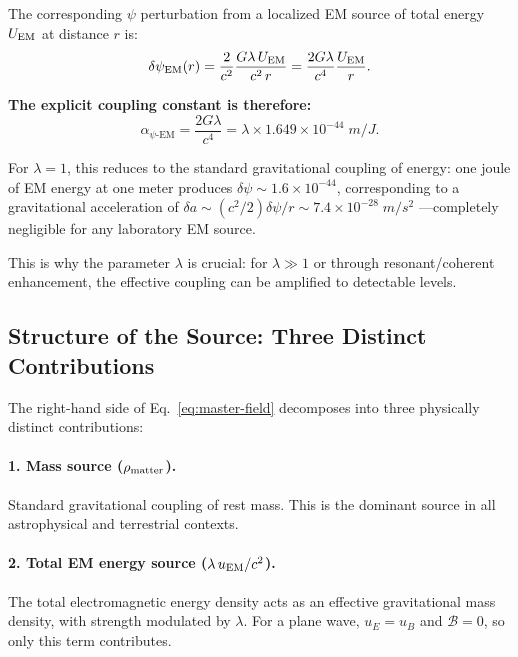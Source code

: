 \documentclass[aps,prd,twocolumn,superscriptaddress,floatfix,nofootinbib]{revtex4-2}
\newcommand{\lam}{\lambda}
\newcommand{\calB}{\mathcal{B}}
\begin{document}
The corresponding $\psi$ perturbation from a localized EM source of
total energy $U_{\rm EM}$ at distance $r$ is:
\begin{equation}
\delta\psi_{\rm EM}(r) = \frac{2}{c^2}\frac{G\lam\,U_{\rm EM}}{c^2\,r}
= \frac{2G\lam}{c^4}\frac{U_{\rm EM}}{r}.
\label{eq:psi-EM-coupling}
\end{equation}

\textbf{The explicit coupling constant is therefore:}
\begin{equation}
\boxed{
\alpha_{\psi\text{-EM}} = \frac{2G\lam}{c^4}
= \lam \times 1.649 \times 10^{-44}\;\si{m/J}.
}
\label{eq:coupling-explicit}
\end{equation}

For $\lam = 1$, this reduces to the standard gravitational coupling
of energy: one joule of EM energy at one meter produces
$\delta\psi \sim 1.6 \times 10^{-44}$, corresponding to a
gravitational acceleration of
$\delta a \sim (c^2/2)\delta\psi/r \sim 7.4 \times 10^{-28}\;\si{m/s^2}$
---completely negligible for any laboratory EM source.

This is why the parameter $\lam$ is crucial: for $\lam \gg 1$ or through
resonant/coherent enhancement, the effective coupling can be amplified
to detectable levels.

\subsection{Structure of the Source: Three Distinct Contributions}
\label{sec:source-structure}

The right-hand side of Eq.~\eqref{eq:master-field} decomposes into
three physically distinct contributions:

\paragraph{1. Mass source ($\rho_{\rm matter}$).} Standard gravitational
coupling of rest mass. This is the dominant source in all astrophysical
and terrestrial contexts.

\paragraph{2. Total EM energy source ($\lam\,u_{\rm EM}/c^2$).}
The total electromagnetic energy density acts as an effective
gravitational mass density, with strength modulated by $\lam$.
For a plane wave, $u_E = u_B$ and $\calB = 0$, so only this term
contributes.
\end{document}
